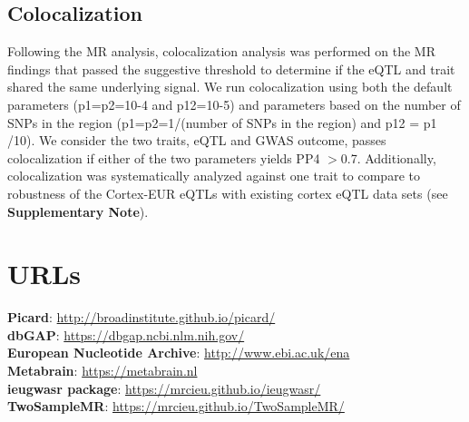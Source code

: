 \subsection{Colocalization}
Following the MR analysis, colocalization analysis was performed on the MR findings that passed the suggestive threshold to determine if the eQTL and trait shared the same underlying signal. We run colocalization using both the default parameters (p1=p2=10-4 and p12=10-5) and parameters based on the number of SNPs in the region (p1=p2=1/(number of SNPs in the region) and p12 = p1 /10). We consider the two traits, eQTL and GWAS outcome, passes colocalization if either of the two parameters yields PP4 $>$0.7. Additionally, colocalization was systematically analyzed against one trait to compare to robustness of the Cortex-EUR eQTLs with existing cortex eQTL data sets (see \textbf{Supplementary Note}). 

\section*{URLs}
\textbf{Picard}: \url{http://broadinstitute.github.io/picard/} \\
\textbf{dbGAP}: \url{https://dbgap.ncbi.nlm.nih.gov/} \\
\textbf{European Nucleotide Archive}: \url{http://www.ebi.ac.uk/ena} \\
\textbf{Metabrain}: \url{https://metabrain.nl } \\
\textbf{ieugwasr package}: \url{https://mrcieu.github.io/ieugwasr/} \\
\textbf{TwoSampleMR}: \url{https://mrcieu.github.io/TwoSampleMR/ }

